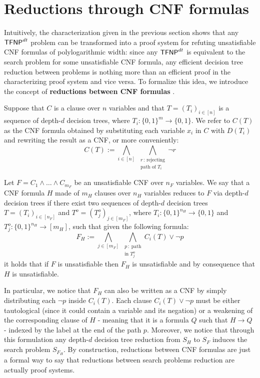 \newpage

\section{Reductions through CNF formulas}

Intuitively, the characterization given in the previous section shows that any $\mathsf{TFNP}^{dt}$ problem can be transformed into a proof system for refuting unsatisfiable CNF formulas of polylogarithmic width: since any $\mathsf{TFNP}^{dt}$ is equivalent to the search problem for some unsatisfiable CNF formula, any efficient decision tree reduction between problems is nothing more than an efficient proof in the characterizing proof system and vice versa. To formalize this idea, we introduce the concept of \textbf{reductions between CNF formulas} \cite{tfnp_characterization}.

Suppose that $C$ is a clause over $n$ variables and that $T = (T_i)_{i \in [n]}$ is a sequence of depth-$d$ decision trees, where $T_i : \{0,1\}^{m} \to \{0,1\}$. We refer to $C(T)$ as the CNF formula obtained by substituting each variable $x_i$ in $C$ with $D(T_i)$ and rewriting the result as a CNF, or more conveniently:
\[C(T) := \bigwedge_{i \in [n]} \, \bigwedge_{\substack{r \,:\, \text{rejecting} \\ \text{path of $T_i$}}} \lnot{r}\]

\begin{definition}
 Let $F = C_1 \land \ldots \land C_{m_F}$ be an unsatisfiable CNF over $n_F$ variables. We say that a CNF formula $H$ made of $m_H$ clauses over $n_H$ variables reduces to $F$ via depth-$d$ decision trees if there exist two sequences of depth-$d$ decision trees $T = (T_i)_{i \in [n_F]}$ and $T^o = (T_j^o)_{j \in [m_F]}$, where $T_i : \{0,1\}^{n_H} \to \{0,1\}$ and $T_j^o : \{0,1\}^{n_H} \to [m_H]$, such that given the following formula:
    \[F_H := \bigwedge_{j \in [m_F]} \,\bigwedge_{\substack{p \,:\; \text{path} \\ \text{in } T_j^o}} C_i(T) \lor \lnot{p}\]
 it holds that if $F$ is unsatisfiable then $F_H$ is unsatisfiable and by consequence that $H$ is unsatisfiable. 
\end{definition}

In particular, we notice that $F_H$ can also be written as a CNF by simply distributing each $\lnot{p}$ inside $C_i(T)$. Each clause $C_i(T) \lor \lnot{p}$ must be either tautological (since it could contain a variable and its negation) or a weakening of the corresponding clause of $H$ - meaning that it is a formula $Q$ such that $H \to Q$ - indexed by the label at the end of the path $p$. Moreover, we notice that through this formulation any depth-$d$ decision tree reduction from $S_H$ to $S_F$ induces the search problem $S_{F_H}$. By construction, reductions between CNF formulas are just a formal way to say that reductions between search problems reduction are actually proof systems.


